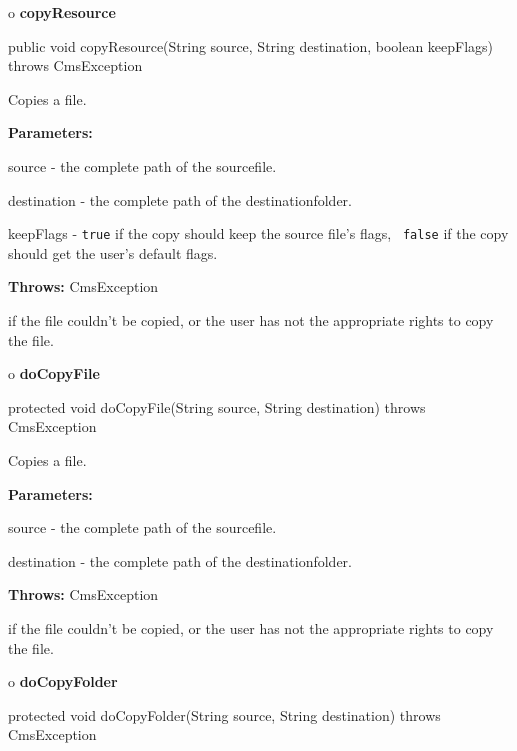 o {\bf copyResource}

\begin{PRE}
 public void copyResource(String source,
                          String destination,
                          boolean keepFlags) throws CmsException
\end{PRE}

\begin{description}
\htmlDD Copies a file.

\begin{description}
\item {\bf Parameters:}

source - the complete path of the sourcefile.

destination - the complete path of the destinationfolder.

keepFlags - {\tt true} if the copy should keep the source file's flags,  {\tt
false} if the copy should get the user's default flags.
\item {\bf Throws:} CmsException

if the file couldn't be copied, or the user has not the appropriate rights to
copy the file.
\end{description}

\end{description}

o {\bf doCopyFile}

\begin{PRE}
 protected void doCopyFile(String source,
                           String destination) throws CmsException
\end{PRE}

\begin{description}
\htmlDD Copies a file.

\begin{description}
\item {\bf Parameters:}

source - the complete path of the sourcefile.

destination - the complete path of the destinationfolder.
\item {\bf Throws:} CmsException

if the file couldn't be copied, or the user has not the appropriate rights to
copy the file.
\end{description}

\end{description}

o {\bf doCopyFolder}

\begin{PRE}
 protected void doCopyFolder(String source,
                             String destination) throws CmsException
\end{PRE}

